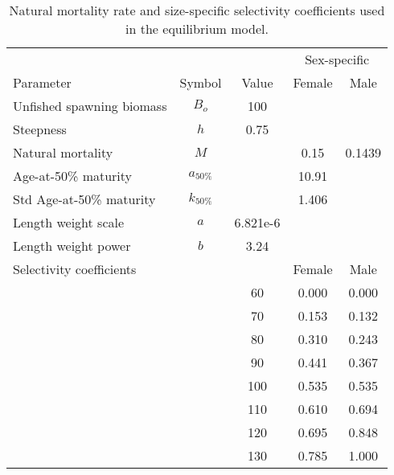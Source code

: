 \begin{table}
	\caption{Natural mortality rate and size-specific selectivity coefficients used in the equilibrium model.}
	\label{table:Life_history_pars}
	\begin{center}
	\begin{tabular}{lcccc}
		\hline
		 &  & & \multicolumn{2}{c}{Sex-specific}\\
		Parameter         & Symbol     & Value & Female & Male \\
		\hline
		Unfished spawning biomass & $B_o$ & 100 & &\\
		Steepness & $h$ & 0.75 & &\\
		Natural mortality & $M$        &       &   0.15 & 0.1439 \\
		Age-at-50\% maturity & $a_{50\%}$ &      &  10.91 & \\
		Std Age-at-50\% maturity & $k_{50\%}$ &      &  1.406 & \\
		Length weight scale & $a$ & 6.821e-6 & &\\
		Length weight power & $b$ & 3.24 & &\\
		\hline
		
		\multicolumn{3}{l}{Selectivity coefficients}
		 Size (cm) & Female & Male\\
		\hline
		&&  60 & 0.000& 0.000\\
		&&  70 & 0.153& 0.132\\
		&&  80 & 0.310& 0.243\\
		&&  90 & 0.441& 0.367\\
		&& 100 & 0.535& 0.535\\
		&& 110 & 0.610& 0.694\\
		&& 120 & 0.695& 0.848\\
		&& 130 & 0.785& 1.000\\
		\hline
		
	\end{tabular}
	\end{center}
\end{table}



